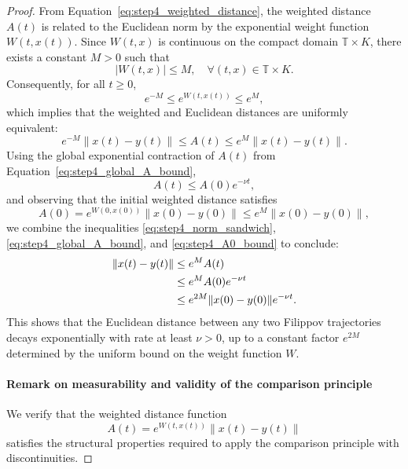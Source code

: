 \documentclass[11pt]{article}
\begin{document}
\begin{proof}
From Equation~\eqref{eq:step4_weighted_distance}, the weighted distance \( A(t) \) is related to the Euclidean norm by the exponential weight function \( W(t,x(t)) \). Since \( W(t,x) \) is continuous on the compact domain \( \mathbb{T} \times K \), there exists a constant \( M > 0 \) such that
\begin{equation} \label{eq:step4_W_bound}
	|W(t,x)| \leq M, \quad \forall (t,x) \in \mathbb{T} \times K.
\end{equation}
Consequently, for all \( t \geq 0 \),
\begin{equation} \label{eq:step4_A_norm_bound}
	e^{-M} \leq e^{W(t,x(t))} \leq e^{M},
\end{equation}
which implies that the weighted and Euclidean distances are uniformly equivalent:
\begin{equation} \label{eq:step4_norm_sandwich}
	e^{-M} \|x(t) - y(t)\| \leq A(t) \leq e^{M} \|x(t) - y(t)\|.
\end{equation}
Using the global exponential contraction of \( A(t) \) from Equation~\eqref{eq:step4_global_A_bound},
\[
A(t) \leq A(0) e^{-\nu t},
\]
and observing that the initial weighted distance satisfies
\begin{equation} \label{eq:step4_A0_bound}
	A(0) = e^{W(0,x(0))} \|x(0) - y(0)\| \leq e^{M} \|x(0) - y(0)\|,
\end{equation}
we combine the inequalities \eqref{eq:step4_norm_sandwich}, \eqref{eq:step4_global_A_bound}, and \eqref{eq:step4_A0_bound} to conclude:
\begin{align}
	\|x(t) - y(t)\|
	&\leq e^{M} A(t) \notag \\
	&\leq e^{M} A(0) e^{-\nu t} \notag \\
	&\leq e^{2M} \|x(0) - y(0)\| e^{-\nu t}. \label{eq:step4_euclidean_contraction}
\end{align}
This shows that the Euclidean distance between any two Filippov trajectories decays exponentially with rate at least \( \nu > 0 \), up to a constant factor \( e^{2M} \) determined by the uniform bound on the weight function \( W \).


\paragraph{Remark on measurability and validity of the comparison principle}

We verify that the weighted distance function
\begin{equation} \label{eq:measurable_A_def}
	A(t) = e^{W(t,x(t))} \|x(t) - y(t)\|
\end{equation}
satisfies the structural properties required to apply the comparison principle with discontinuities.


\end{proof}
\end{document}
